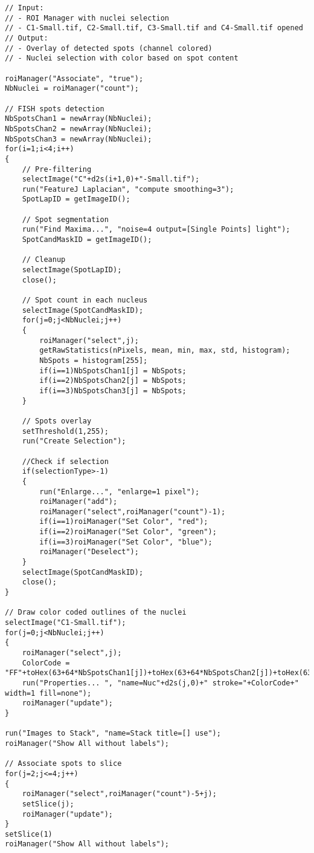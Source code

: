 \begin{lstlisting}
// Input: 
// - ROI Manager with nuclei selection
// - C1-Small.tif, C2-Small.tif, C3-Small.tif and C4-Small.tif opened
// Output: 
// - Overlay of detected spots (channel colored)
// - Nuclei selection with color based on spot content

roiManager("Associate", "true");
NbNuclei = roiManager("count");

// FISH spots detection
NbSpotsChan1 = newArray(NbNuclei);
NbSpotsChan2 = newArray(NbNuclei);
NbSpotsChan3 = newArray(NbNuclei);
for(i=1;i<4;i++)
{	
	// Pre-filtering
	selectImage("C"+d2s(i+1,0)+"-Small.tif");
	run("FeatureJ Laplacian", "compute smoothing=3");
	SpotLapID = getImageID();
	
	// Spot segmentation
	run("Find Maxima...", "noise=4 output=[Single Points] light");
	SpotCandMaskID = getImageID();
	
	// Cleanup
	selectImage(SpotLapID);	
	close();

	// Spot count in each nucleus
	selectImage(SpotCandMaskID);
	for(j=0;j<NbNuclei;j++)
	{
		roiManager("select",j);
		getRawStatistics(nPixels, mean, min, max, std, histogram);
		NbSpots = histogram[255];
		if(i==1)NbSpotsChan1[j] = NbSpots;
		if(i==2)NbSpotsChan2[j] = NbSpots;
		if(i==3)NbSpotsChan3[j] = NbSpots;
	}
		
	// Spots overlay
	setThreshold(1,255);
	run("Create Selection");
	
	//Check if selection
	if(selectionType>-1)
	{
		run("Enlarge...", "enlarge=1 pixel");
		roiManager("add");
		roiManager("select",roiManager("count")-1);
		if(i==1)roiManager("Set Color", "red");
		if(i==2)roiManager("Set Color", "green");
		if(i==3)roiManager("Set Color", "blue");
		roiManager("Deselect");
	}
	selectImage(SpotCandMaskID);
	close();
}
	
// Draw color coded outlines of the nuclei
selectImage("C1-Small.tif");
for(j=0;j<NbNuclei;j++)
{
	roiManager("select",j);
	ColorCode = "FF"+toHex(63+64*NbSpotsChan1[j])+toHex(63+64*NbSpotsChan2[j])+toHex(63+64*NbSpotsChan3[j]);
	run("Properties... ", "name=Nuc"+d2s(j,0)+" stroke="+ColorCode+" width=1 fill=none");
	roiManager("update");
}

run("Images to Stack", "name=Stack title=[] use");
roiManager("Show All without labels");

// Associate spots to slice
for(j=2;j<=4;j++)
{
	roiManager("select",roiManager("count")-5+j);
	setSlice(j);
	roiManager("update");
}
setSlice(1)
roiManager("Show All without labels");
\end{lstlisting}